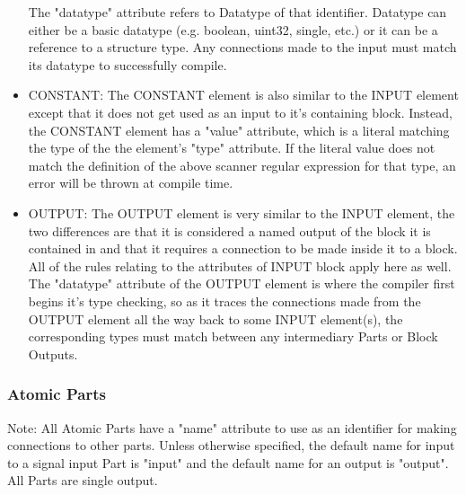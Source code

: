 \begin{itemize}[label={}]
The "datatype" attribute refers to Datatype of that identifier.
Datatype can either be a basic datatype (e.g. boolean, uint32, single, etc.) or it can be a reference to a structure type.
Any connections made to the input must match its datatype to successfully compile.
    \item CONSTANT:
The CONSTANT element is also similar to the INPUT element except that it does not get used as an input to it's containing block.
Instead, the CONSTANT element has a "value" attribute, which is a literal matching the type of the the element's "type" attribute.
If the literal value does not match the definition of the above scanner regular expression for that type, an error will be thrown at compile time.
    \item OUTPUT:
The OUTPUT element is very similar to the INPUT element, the two differences are that it is considered a named output of the block it is contained in and that it requires a connection to be made inside it to a block.
All of the rules relating to the attributes of INPUT block apply here as well.
The "datatype" attribute of the OUTPUT element is where the compiler first begins it's type checking, so as it traces the connections made from the OUTPUT element all the way back to some INPUT element(s), the corresponding types must match between any intermediary Parts or Block Outputs.
\end{itemize}
\subsubsection{Atomic Parts}
Note: All Atomic Parts have a "name" attribute to use as an identifier for making connections to other parts. Unless otherwise specified, the default name for input to a signal input Part is "input" and the default name for an output is "output". All Parts are single output.

